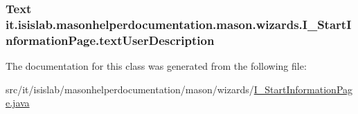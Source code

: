 \hypertarget{classit_1_1isislab_1_1masonhelperdocumentation_1_1mason_1_1wizards_1_1_i___start_information_page_a5b9b23fd18d352b235614b6bdfd23477}{
\subsubsection[{text\-User\-Description}]{\setlength{\rightskip}{0pt plus 5cm}Text it.\-isislab.\-masonhelperdocumentation.\-mason.\-wizards.\-I\-\_\-\-Start\-Information\-Page.\-text\-User\-Description\hspace{0.3cm}{\ttfamily [private]}}}\label{classit_1_1isislab_1_1masonhelperdocumentation_1_1mason_1_1wizards_1_1_i___start_information_page_a5b9b23fd18d352b235614b6bdfd23477}


The documentation for this class was generated from the following file\-:\begin{DoxyCompactItemize}
\item 
src/it/isislab/masonhelperdocumentation/mason/wizards/\hyperlink{_i___start_information_page_8java}{I\-\_\-\-Start\-Information\-Page.\-java}\end{DoxyCompactItemize}

